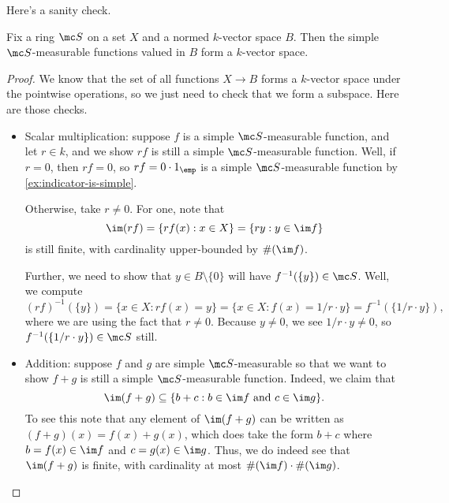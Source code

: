 \documentclass[../notes.tex]{subfiles}
\begin{document}
Here's a sanity check.
\begin{lemma} \label{lem:simple-meas-is-k-vec}
	Fix a ring $\mc S$ on a set $X$ and a normed $k$-vector space $B$. Then the simple $\mc S$-measurable functions valued in $B$ form a $k$-vector space.
\end{lemma}
\begin{proof}
	We know that the set of all functions $X\to B$ forms a $k$-vector space under the pointwise operations, so we just need to check that we form a subspace. Here are those checks.
	\begin{itemize}
		\item Scalar multiplication: suppose $f$ is a simple $\mc S$-measurable function, and let $r\in k$, and we show $rf$ is still a simple $\mc S$-measurable function. Well, if $r=0$, then $rf=0$, so $rf=0\cdot1_{\emp}$ is a simple $\mc S$-measurable function by \autoref{ex:indicator-is-simple}.
		
		Otherwise, take $r\ne0$. For one, note that
		\[\im(rf)=\{rf(x):x\in X\}=\{ry:y\in\im f\}\]
		is still finite, with cardinality upper-bounded by $\#(\im f)$.

		Further, we need to show that $y\in B\setminus\{0\}$ will have $f^{-1}(\{y\})\in\mc S$. Well, we compute
		\[(rf)^{-1}(\{y\})=\{x\in X:rf(x)=y\}=\{x\in X:f(x)=1/r\cdot y\}=f^{-1}(\{1/r\cdot y\}),\]
		where we are using the fact that $r\ne0$. Because $y\ne0$, we see $1/r\cdot y\ne0$, so $f^{-1}(\{1/r\cdot y\})\in\mc S$ still.

		\item Addition: suppose $f$ and $g$ are simple $\mc S$-measurable so that we want to show $f+g$ is still a simple $\mc S$-measurable function. Indeed, we claim that
		\[\im(f+g)\subseteq\{b+c:b\in\im f\text{ and }c\in\im g\}.\]
		To see this note that any element of $\im(f+g)$ can be written as $(f+g)(x)=f(x)+g(x)$, which does take the form $b+c$ where $b=f(x)\in\im f$ and $c=g(x)\in\im g$. Thus, we do indeed see that $\im(f+g)$ is finite, with cardinality at most $\#(\im f)\cdot\#(\im g)$.


\end{itemize}
\end{proof}
\end{document}
